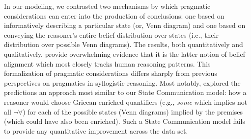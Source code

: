\documentclass[floatsintext, doc]{apa6}
\newcommand{\mht}[1]{{\textcolor{Blue}{[mht: #1]}}}
\begin{document}
In our modeling, we contrasted two mechanisms by which pragmatic considerations can enter into the production of conclusions: one based on informatively describing a particular state (or, Venn diagram) and one based on conveying the reasoner's entire belief distribution over states (i.e., their distribution over possible Venn diagrams). 
The results, both quantitatively and qualitatively, provide overwhelming evidence that it is the latter notion of belief alignment which most closely tracks human reasoning patterns. 
This formalization of pragmatic considerations differs sharply from previous perspectives on pragmatics in syllogistic reasoning.
Most notably,  explored the predictions an approach most similar to our State Communication model: how a reasoner would choose Gricean-enriched quantifiers (e.g., \emph{some} which implies not all $\neg \forall$) for each of the possible states (Venn diagrams) implied by the premises (which could have also been enriched). 
Such a State Communication model fails to provide any quantitative improvement across the data set.




\end{document}
